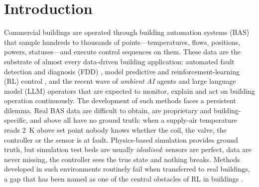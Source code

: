 \documentclass[preprint,12pt,authoryear=false]{elsarticle}
\begin{document}
\linenumbers

\section{Introduction}
\label{sec:intro}

Commercial buildings are operated through building automation systems (BAS) that sample hundreds to thousands of
points---temperatures, flows, positions, powers, statuses---and execute control sequences on them. These data are the
substrate of almost every data-driven building application: automated fault detection and diagnosis (FDD)
\cite{katipamula2005review1,kim2018fddreview}, model predictive and reinforcement-learning (RL) control
\cite{wang2020rlreview,wei2017drl,zhang2018radiant}, and the recent wave of \emph{ambient AI} agents and large language
model (LLM) operators that are expected to monitor, explain and act on building operation continuously. The
development of such methods faces a persistent dilemma. Real BAS data are difficult to obtain, are proprietary and
building-specific, and above all have no ground truth: when a supply-air temperature reads 2~K above set point nobody
knows whether the coil, the valve, the controller or the sensor is at fault. Physics-based simulation provides
ground truth, but simulation test beds are usually \emph{idealised}: sensors are perfect, data are never missing, the
controller sees the true state and nothing breaks. Methods developed in such environments routinely fail when
transferred to real buildings, a gap that has been named as one of the central obstacles of RL in buildings
\cite{nweye2022realworld,dulacarnold2021challenges}.
\end{document}
